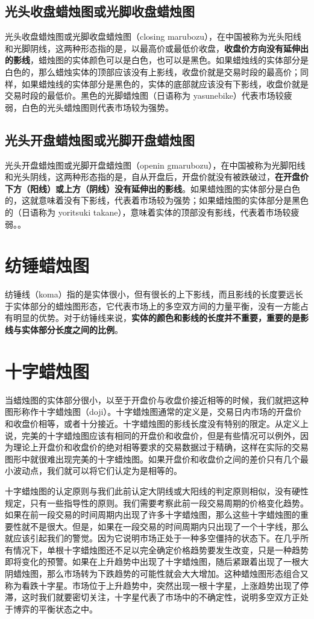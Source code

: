 \subsection*{光头收盘蜡烛图或光脚收盘蜡烛图}
光头收盘蜡烛图或光脚收盘蜡烛图（closing marubozu），在中国被称为光头阳线和光脚阴线，这两种形态指的是，以最高价或最低价收盘，\textbf{收盘价方向没有延伸出的影线}，蜡烛图的实体颜色可以是白色，也可以是黑色。如果蜡烛线的实体部分是白色的，那么蜡烛实体的顶部应该没有上影线，收盘价就是交易时段的最高价；同样，如果蜡烛线的实体部分是黑色的，实体的底部就应该没有下影线，收盘价就是交易时段的最低价。黑色的光脚蜡烛图（日语称为 yasunebike）代表市场较疲弱，白色的光头蜡烛图则代表市场较为强势。
\subsection*{光头开盘蜡烛图或光脚开盘蜡烛图}
光头开盘蜡烛图或光脚开盘蜡烛图（openin gmarubozu），在中国被称为光脚阳线和光头阴线，这两种形态指的是，自从开盘后，开盘价就没有被跌破过，\textbf{在开盘价下方（阳线）或上方（阴线）没有延伸出的影线}。如果蜡烛图的实体部分是白色的，这就意味着没有下影线，代表着市场较为强势；如果蜡烛图的实体部分是黑色的（日语称为 yoritsuki takane），意味着实体的顶部没有影线，代表着市场较疲弱。。
\section{纺锤蜡烛图}
纺锤线（koma）指的是实体很小，但有很长的上下影线，而且影线的长度要远长于实体部分的蜡烛图形态，它代表市场上的多空双方间的力量平衡，没有一方能占有明显的优势。对于纺锤线来说，\textbf{实体的颜色和影线的长度并不重要，重要的是影线与实体部分长度之间的比例}。
\section{十字蜡烛图}
当蜡烛图的实体部分很小，以至于开盘价与收盘价接近相等的时候，我们就把这种图形称作十字蜡烛图（doji）。十字蜡烛图通常的定义是，交易日内市场的开盘价和收盘价相等，或者十分接近。十字蜡烛图的影线长度没有特别的限定。从定义上说，完美的十字蜡烛图应该有相同的开盘价和收盘价，但是有些情况可以例外，因为理论上开盘价和收盘价的绝对相等要求的交易数据过于精确，这样在实际的交易图形中就很难出现完美的十字蜡烛图。如果开盘价和收盘价之间的差价只有几个最小波动点，我们就可以将它们认定为是相等的。

十字蜡烛图的认定原则与我们此前认定大阴线或大阳线的判定原则相似，没有硬性规定，只有一些指导性的原则。我们需要考察此前一段交易周期的价格变化趋势。如果在前一段交易的时间周期内出现了许多十字蜡烛图，那么这些十字蜡烛图的重要性就不是很大。但是，如果在一段交易的时间周期内只出现了一个十字线，那么就应该引起我们的警觉。因为它说明市场正处于一种多空僵持的状态下。在几乎所有情况下，单根十字蜡烛图还不足以完全确定价格趋势要发生改变，只是一种趋势即将变化的预警。如果在上升趋势中出现了十字蜡烛图，随后紧跟着出现了一根大阴蜡烛图，那么市场转为下跌趋势的可能性就会大大增加。这种蜡烛图形态组合又称为看跌十字星。市场位于上升趋势中，突然出现一根十字星，上涨趋势出现了停滞，这时我们就要密切关注，十字星代表了市场中的不确定性，说明多空双方正处于博弈的平衡状态之中。

